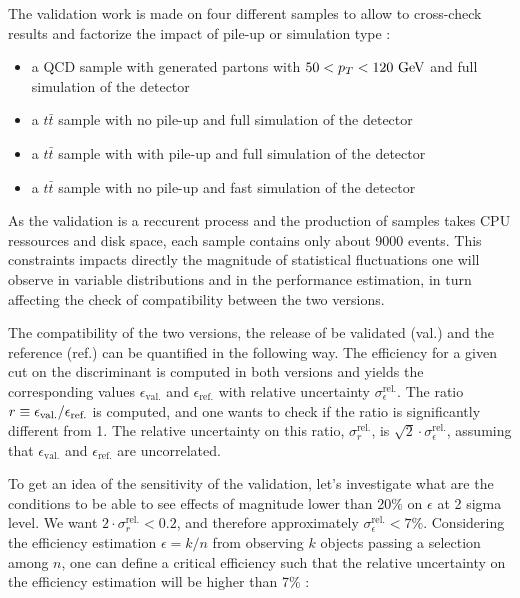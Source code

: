     The validation work is made on four different samples to allow to cross-check results
    and factorize the impact of pile-up or simulation type :
    \begin{itemize}
        \item a QCD sample with generated partons with $50 < p_T < 120~\text{GeV}$ and full simulation
        of the detector
        \item a $t\bar{t}$ sample with no pile-up and full simulation of the detector
        \item a $t\bar{t}$ sample with with pile-up and full simulation of the detector
        \item a $t\bar{t}$ sample with no pile-up and fast simulation of the detector
    \end{itemize}

    As the validation is a reccurent process and the production of samples takes CPU
    ressources and disk space, each sample contains only about 9000 events. This constraints
    impacts directly the magnitude of statistical fluctuations one will observe in
    variable distributions and in the performance estimation, in turn affecting the check of compatibility
    between the two versions.

    The compatibility of the two versions, the release of be validated (val.) and the
    reference (ref.) can be quantified in the following way. The efficiency for a given
    cut on the discriminant is computed in both versions and yields the corresponding
    values $\epsilon_\text{val.}$ and $\epsilon_\text{ref.}$ with relative uncertainty
    $\sigma^\text{rel.}_\epsilon$. The ratio $r \equiv \epsilon_\text{val.}/\epsilon_\text{ref.}$
    is computed, and one wants to check if the ratio is significantly different from 1.
    The relative uncertainty on this ratio, $\sigma^\text{rel.}_r$, is $\sqrt{2} \cdot \sigma^\text{rel.}_\epsilon$,
    assuming that $\epsilon_\text{val.}$ and $\epsilon_\text{ref.}$ are uncorrelated.

    To get an idea of the sensitivity of the validation, let's investigate what are the
    conditions to be able to see effects of magnitude lower than 20\% on $\epsilon$ at 2
    sigma level. We want $2 \cdot \sigma^\text{rel.}_r < 0.2$, and therefore approximately
    $\sigma^\text{rel.}_\epsilon < 7\%$. Considering the efficiency estimation $\epsilon
    = k/n$ from observing $k$ objects passing a selection among $n$, one can define a
    critical efficiency such that the relative uncertainty on the efficiency estimation
    will be higher than 7\% :

